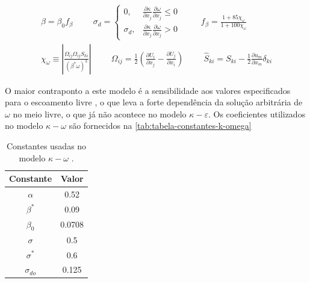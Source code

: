 \begin{equation}
\begin{aligned}
	\beta = \beta_{0}f_{\beta} 
	\hspace{1cm}
	\sigma_{d} =
	\begin{cases}
		0, &	\frac{\partial\kappa}{\partial x_j	}\frac{\partial \omega}{\partial x_j} \leq 0 \\
		\sigma_d, & \frac{\partial\kappa}{\partial x_j	}\frac{\partial \omega}{\partial x_j} > 0
	\end{cases}
	\hspace{1cm}
	f_{\beta} = \frac{1 + 85\chi_{\omega}}{1 + 100\chi_{\omega}} \\
	\chi_{\omega} \equiv \left|\frac{\Omega_{ij}\Omega_{ij}\hat{S}_{ki}}{(\beta^{*}\omega)^3}\right|
	\hspace{1cm}
	\Omega_{ij} = \frac{1}{2}\left(\frac{\partial U_i}{\partial x_j} - \frac{\partial U_j}{\partial x_i}\right)
	\hspace{1cm}
	\hat{S}_{ki} = S_{ki} - \frac{1}{2}\frac{\partial u_m}{\partial x_m}\delta_{ki}
\end{aligned}
\end{equation}

O maior contraponto a este modelo é a sensibilidade aos valores especificados para o escoamento livre \cite{Menter1992}, o que leva a forte dependência da solução arbitrária de \(\omega\) no meio livre, o que já não acontece no modelo \(\kappa-\varepsilon\). Os coeficientes utilizados no modelo \(\kappa-\omega\) são fornecidos na \autoref{tab:tabela-constantes-k-omega}

\begin{table}[ht]
\centering
\caption[Constantes usadas no modelo \(\kappa-\omega\).]{Constantes usadas no modelo \(\kappa-\omega\) \cite{Wilcox1988ReassessmentOT,Wilcox2006,Wilcox2008}.}
\vspace{0.5cm}
\begin{tabular}{c|c}
 
Constante & Valor \\
\hline
\(\alpha\) 		& \num{0,52} \\
\(\beta^*\) 	& \num{0,09} \\
\(\beta_{0}\) 	& \num{0,0708} \\
\(\sigma\) 		& \num{0,5} \\
\(\sigma^*\) 	& \num{0,6} \\
\(\sigma_{do}\) & \num{0,125}

\end{tabular}
\label{tab:tabela-constantes-k-omega}
\end{table}


